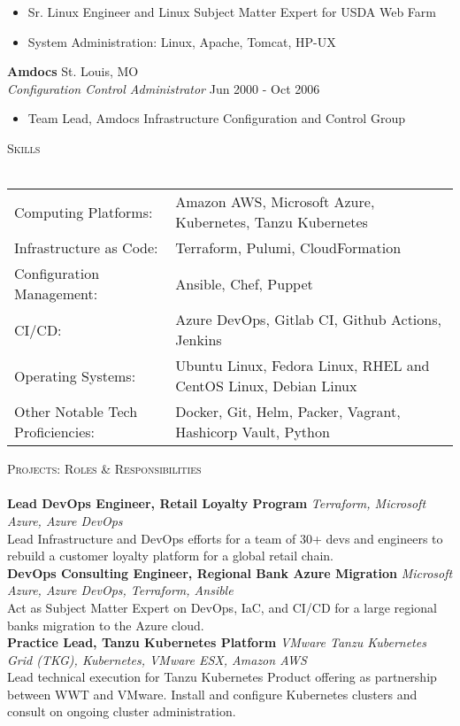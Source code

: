 \documentclass[letterpaper]{article}
\newcommand{\lineunder} {
    \vspace*{-8pt} \\
    \hspace*{-18pt} \hrulefill \\
}
\newcommand{\header} [1] {
    {\hspace*{-18pt}\vspace*{6pt} \textsc{#1}}
    \vspace*{-6pt} \lineunder
}
\begin{document}
\begin{itemize} \itemsep 1pt
	\item Sr. Linux Engineer and Linux Subject Matter Expert for USDA Web Farm
	\item System Administration: Linux, Apache, Tomcat, HP-UX
\end{itemize}
\textbf{Amdocs} \hfill St. Louis, MO\\
\textit{Configuration Control Administrator} \hfill Jun 2000 - Oct 2006\\
\vspace{-1mm}
\begin{itemize} \itemsep 1pt
	\item Team Lead, Amdocs Infrastructure Configuration and Control Group
\end{itemize}

\header{Skills}
\begin{tabular}{ l l }
	Computing Platforms:              & Amazon AWS, Microsoft Azure, Kubernetes, Tanzu Kubernetes       \\
	Infrastructure as Code:           & Terraform, Pulumi, CloudFormation                               \\
	Configuration Management:         & Ansible, Chef, Puppet                                           \\
	CI/CD:                            & Azure DevOps, Gitlab CI, Github Actions, Jenkins                \\
	Operating Systems:                & Ubuntu Linux, Fedora Linux, RHEL and CentOS Linux, Debian Linux \\
	Other Notable Tech Proficiencies: & Docker, Git, Helm, Packer, Vagrant, Hashicorp Vault, Python     \\
\end{tabular}
\vspace{2mm}

\header{Projects: Roles \& Responsibilities}
{\textbf{Lead DevOps Engineer, Retail Loyalty Program}} {\sl Terraform, Microsoft Azure, Azure DevOps} \\
Lead Infrastructure and DevOps efforts for a team of 30+ devs and engineers to rebuild a customer loyalty platform for a global retail chain.\\
\vspace*{2mm}
{\textbf{DevOps Consulting Engineer, Regional Bank Azure Migration}} {\sl Microsoft Azure, Azure DevOps, Terraform, Ansible} \\
Act as Subject Matter Expert on DevOps, IaC, and CI/CD for a large regional bank\textquotesingle{}s migration to the Azure cloud.\\
\vspace*{2mm}
{\textbf{Practice Lead, Tanzu Kubernetes Platform}} {\sl VMware Tanzu Kubernetes Grid (TKG), Kubernetes, VMware ESX, Amazon AWS} \\
Lead technical execution for Tanzu Kubernetes Product offering as partnership between WWT and VMware. Install and configure Kubernetes clusters and consult on ongoing cluster administration.\\
\vspace*{2mm}
\end{document}
